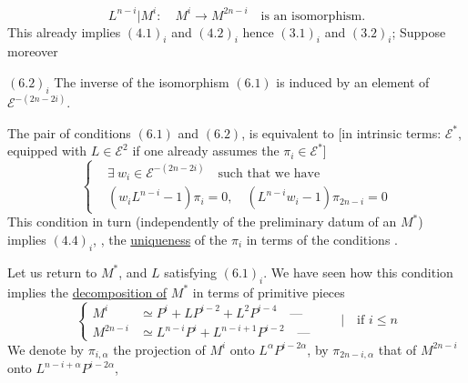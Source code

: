 \[
L^{n-i}|M^i:\quad M^i\longrightarrow M^{2n-i}\quad\text{is an isomorphism.}
\tag*{$(6.1)_i$}
\]
This already implies $(4.1)_i$ and $(4.2)_i$ hence $(3.1)_i$ and $(3.2)_i$;  Suppose moreover

$(6.2)_i$ The inverse of the isomorphism $(6.1)$ is  induced by an element of $\mathcal E^{-(2n-2i)}$.

 The pair of conditions $(6.1)$ and $(6.2)$, is equivalent to [in intrinsic terms: $\mathcal E^*$, equipped with $L\in\mathcal E^2$ if one already assumes the $\pi_i\in\mathcal E^*$]
\[
\left\{\begin{aligned}
&\exists\ w_i\in\mathcal E^{-(2n-2i)}\quad\text{such that we have}\\
&(w_iL^{n-i}-1)\pi_i=0,\quad(L^{n-i}w_i-1)\pi_{2n-i}=0
\end{aligned}\right.
\tag*{$(6.3.)_i$}
\]
This condition in turn (independently of the preliminary datum of an $M^*$) implies $(4.4)_i$, ,  the \uline{uniqueness} of the $\pi_i$ in terms of the conditions .

Let us return to $M^*$, and $L$ satisfying $(6.1)_i$. We have seen how  this condition implies the \uline{decomposition of} $M^*$ in  terms of primitive pieces
\[
\left\{\begin{aligned}
M^i&\simeq P^i+LP^{i-2}+L^2P^{i-4}\quad\text{---}\\
M^{2n-i}&\simeq L^{n-i}P^i+L^{n-i+1}P^{i-2}\quad\text{---}
\end{aligned}\right.\qquad\bigg|\quad\text{if }i\leq n
\tag{6.4}
\]
We denote by $\pi_{i,\alpha}$ the projection of $M^i$ onto $L^\alpha P^{i-2\alpha}$, by $\pi_{2n-i,\alpha}$ that of $M^{2n-i}$ onto $L^{n-i+\alpha}P^{i-2\alpha}$,
